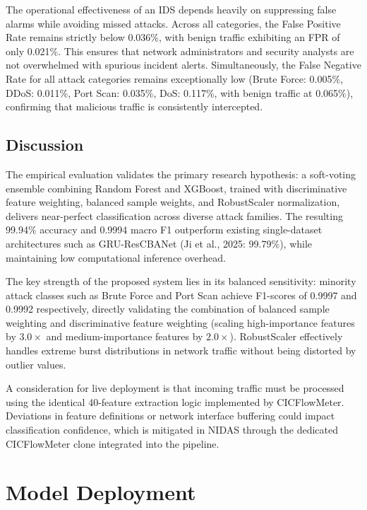 \documentclass[12pt,a4paper]{report}
\begin{document}
The operational effectiveness of an IDS depends heavily on suppressing false alarms while avoiding missed attacks. Across all categories, the False Positive Rate remains strictly below 0.036\%, with benign traffic exhibiting an FPR of only 0.021\%. This ensures that network administrators and security analysts are not overwhelmed with spurious incident alerts. Simultaneously, the False Negative Rate for all attack categories remains exceptionally low (Brute Force: 0.005\%, DDoS: 0.011\%, Port Scan: 0.035\%, DoS: 0.117\%, with benign traffic at 0.065\%), confirming that malicious traffic is consistently intercepted.

\section{Discussion}

The empirical evaluation validates the primary research hypothesis: a soft-voting ensemble combining Random Forest and XGBoost, trained with discriminative feature weighting, balanced sample weights, and RobustScaler normalization, delivers near-perfect classification across diverse attack families. The resulting 99.94\% accuracy and 0.9994 macro F1 outperform existing single-dataset architectures such as GRU-ResCBANet (Ji et al., 2025: 99.79\%), while maintaining low computational inference overhead.

The key strength of the proposed system lies in its balanced sensitivity: minority attack classes such as Brute Force and Port Scan achieve F1-scores of 0.9997 and 0.9992 respectively, directly validating the combination of balanced sample weighting and discriminative feature weighting (scaling high-importance features by $3.0\times$ and medium-importance features by $2.0\times$). RobustScaler effectively handles extreme burst distributions in network traffic without being distorted by outlier values.

A consideration for live deployment is that incoming traffic must be processed using the identical 40-feature extraction logic implemented by CICFlowMeter. Deviations in feature definitions or network interface buffering could impact classification confidence, which is mitigated in NIDAS through the dedicated CICFlowMeter clone integrated into the pipeline.


\newpage
\chapter{Model Deployment}
\end{document}
